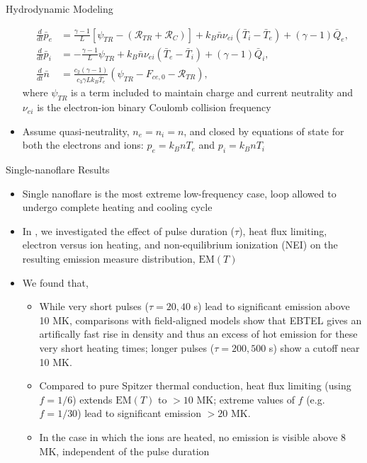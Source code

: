 \documentclass[final]{beamer}
\begin{document}
\begin{frame}
\begin{columns}[t]
\begin{column}{0.49\linewidth}
\begin{block}{Hydrodynamic Modeling}
\begin{itemize}
        \begin{align}
          \frac{d}{dt}\bar{p}_e &= \frac{\gamma - 1}{L}\left\lbrack\psi_{TR} - (\mathcal{R}_{TR} + \mathcal{R}_C)\right\rbrack + k_B\bar{n}\nu_{ei}(\bar{T}_i - \bar{T}_e) + (\gamma - 1)\bar{Q}_e,\label{eq:ebtel_pe} \\[0.5em]
		      \frac{d}{dt}\bar{p}_i &= -\frac{\gamma - 1}{L}\psi_{TR} + k_B\bar{n}\nu_{ei}(\bar{T}_e - \bar{T}_i) + (\gamma - 1)\bar{Q}_i,\label{eq:ebtel_pi}\\[0.5em]
		      \frac{d}{dt}\bar{n} &= \frac{c_2(\gamma - 1)}{c_3\gamma Lk_B\bar{T}_e}\left(\psi_{TR} - F_{ce,0} - \mathcal{R}_{TR}\right),\label{eq:ebtel_n}
        \end{align}
        where $\psi_{TR}$ is a term included to maintain charge and current neutrality and $\nu_{ei}$ is the electron-ion binary Coulomb collision frequency
        \item Assume quasi-neutrality, $n_e=n_i=n$, and closed by equations of state for both the electrons and ions: $p_e=k_BnT_e$ and $p_i=k_BnT_i$
      \end{itemize}
    \end{block}
    \begin{block}{Single-nanoflare Results}
      \begin{itemize}
        \item Single nanoflare is the most extreme low-frequency case, loop allowed to undergo complete heating and cooling cycle
        \item In \citet[submitted]{barnes_inference_2016}, we investigated the effect of pulse duration ($\tau$), heat flux limiting, electron versus ion heating, and non-equilibrium ionization (NEI) on the resulting emission measure distribution, $\mathrm{EM}(T)$
        \item We found that,
        \begin{itemize}
          \item While very short pulses ($\tau=20,40$ s) lead to significant emission above 10 MK, comparisons with field-aligned models show that EBTEL gives an artifically fast rise in density and thus an excess of hot emission for these very short heating times; longer pulses ($\tau=200,500$ s) show a cutoff near 10 MK.
          \item Compared to pure Spitzer thermal conduction, heat flux limiting (using $f=1/6$) extends $\mathrm{EM}(T)$ to $>10$ MK; extreme values of $f$ (e.g. $f=1/30$) lead to significant emission $>20$ MK.
          \item In the case in which the ions are heated, no emission is visible above 8 MK, independent of the pulse duration

\end{itemize}
\end{itemize}
\end{block}
\end{column}
\end{columns}
\end{frame}
\end{document}
